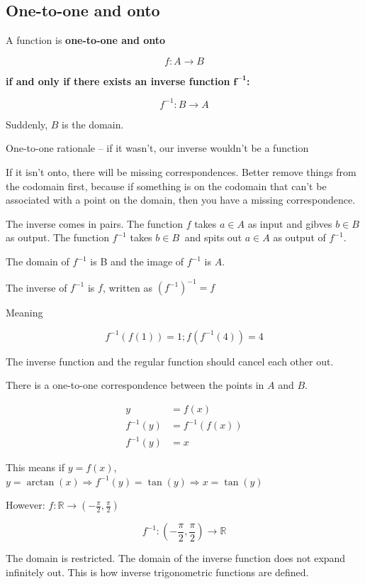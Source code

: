 \documentclass[
]{article}
\begin{document}
\subsection{One-to-one and onto}

A function is \textbf{one-to-one and onto}

$$f:A \rightarrow B$$

\textbf{if and only if there exists an inverse function}
$\mathbf{f}^{\mathbf{- 1}}$\textbf{:}

$$f^{- 1}:B \rightarrow A$$

Suddenly, $B$ is the domain.

One-to-one rationale -- if it wasn't, our inverse wouldn't be a function

If it isn't onto, there will be missing correspondences. Better remove
things from the codomain first, because if something is on the codomain
that can't be associated with a point on the domain, then you have a
missing correspondence.

The inverse comes in pairs. The function $f$ takes $a \in A$ as
input and gibves $b \in B$ as output. The function $f^{- 1}$ takes
$b \in B\ $ and spits out $a \in A$ as output of $f^{- 1}$.

The domain of $f^{- 1}$ is B and the image of $f^{- 1}$ is $A$.

The inverse of $f^{- 1}$ is $f$, written as
$\left( f^{- 1} \right)^{- 1} = f$

Meaning

$$f^{- 1}\left( f(1) \right) = 1;f\left( f^{- 1}(4) \right) = 4$$

The inverse function and the regular function should cancel each other
out.

There is a one-to-one correspondence between the points in $A$ and
$B$.

\begin{align*}
y &= f(x)
 \\
f^{- 1}(y) &= f^{- 1}\left( f(x) \right)
 \\
f^{- 1}(y) &= x
\end{align*}


This means if $y = f(x)$,
$y = \arctan(x) \Rightarrow f^{- 1}(y) = \tan(y) \Rightarrow x = \tan(y)$

However:
$f\mathbb{:R \rightarrow}\left( - \frac{\pi}{2},\frac{\pi}{2} \right)$

$$f^{- 1}:\left( - \frac{\pi}{2},\frac{\pi}{2} \right)\mathbb{\rightarrow R}$$

The domain is restricted. The domain of the inverse function does not
expand infinitely out. This is how inverse trigonometric functions are
defined.
\end{document}
